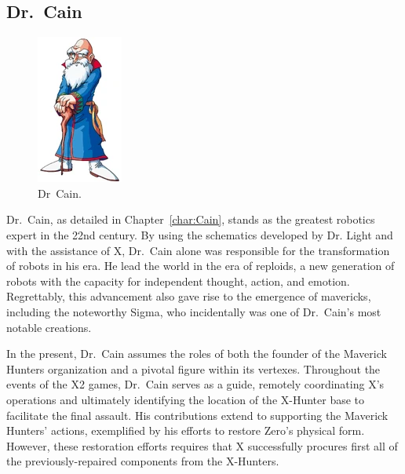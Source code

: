 \subsection{Dr.~Cain}
\begin{figure}[htp]
	\centering
	\includegraphics[height=\portraitsize]{figures/Characters/Char_Cain_X2.png}
	\caption{Dr~Cain.}
\end{figure}
Dr.~Cain, as detailed in Chapter~\ref{char:Cain}, stands as the greatest robotics expert in the 22nd century\cite{Xcoll1:Manual_X2}. By using the schematics developed by Dr. Light and with the assistance of X, Dr.~Cain alone was responsible for the transformation of robots in his era. He lead the world in the era of reploids, a new generation of robots  with the capacity for independent thought, action, and emotion. Regrettably, this advancement also gave rise to the emergence of mavericks, including the noteworthy Sigma, who incidentally was one of Dr.~Cain's most notable creations.

In the present, Dr.~Cain assumes the roles of both the founder of the Maverick Hunters organization and a pivotal figure within its vertexes. Throughout the events of the X2 games, Dr.~Cain serves as a guide, remotely coordinating X's operations and ultimately identifying the location of the X-Hunter base to facilitate the final assault. His contributions extend to supporting the Maverick Hunters' actions, exemplified by his efforts to restore Zero's physical form. However, these restoration efforts requires that X successfully procures  first all of the previously-repaired components from the X-Hunters.

